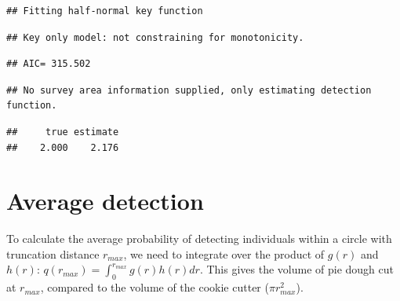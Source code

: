 \documentclass[12pt,]{book}
\newenvironment{Shaded}{\begin{snugshade}}{\end{snugshade}}
\newcommand{\DataTypeTok}[1]{\textcolor[rgb]{0.13,0.29,0.53}{#1}}
\newcommand{\DecValTok}[1]{\textcolor[rgb]{0.00,0.00,0.81}{#1}}
\newcommand{\KeywordTok}[1]{\textcolor[rgb]{0.13,0.29,0.53}{\textbf{#1}}}
\newcommand{\NormalTok}[1]{#1}
\newcommand{\OperatorTok}[1]{\textcolor[rgb]{0.81,0.36,0.00}{\textbf{#1}}}
\newcommand{\OtherTok}[1]{\textcolor[rgb]{0.56,0.35,0.01}{#1}}
\newcommand{\StringTok}[1]{\textcolor[rgb]{0.31,0.60,0.02}{#1}}
\begin{document}
\begin{Shaded}
\end{Shaded}

\begin{verbatim}
## Fitting half-normal key function
\end{verbatim}

\begin{verbatim}
## Key only model: not constraining for monotonicity.
\end{verbatim}

\begin{verbatim}
## AIC= 315.502
\end{verbatim}

\begin{verbatim}
## No survey area information supplied, only estimating detection function.
\end{verbatim}

\begin{Shaded}
\end{Shaded}

\begin{verbatim}
##     true estimate 
##    2.000    2.176
\end{verbatim}

\hypertarget{average-detection}{%
\section{Average detection}\label{average-detection}}

To calculate the average probability of detecting individuals
within a circle with truncation distance \(r_{max}\), we need to
integrate over the product of \(g(r)\) and \(h(r)\):
\(q(r_{max})=\int_{0}^{r_{max}} g(r) h(r) dr\).
This gives the volume of pie dough cut at \(r_{max}\),
compared to the volume of the cookie cutter (\(\pi r_{max}^2\)).
\end{document}
